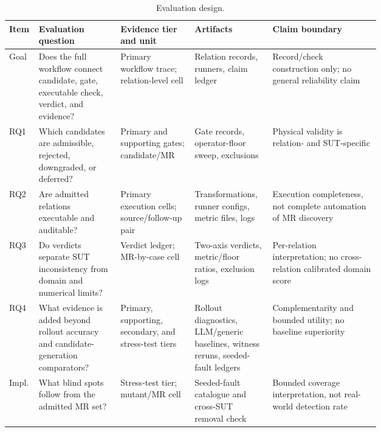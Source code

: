 \documentclass[preprint,12pt]{elsarticle}
\begin{document}
\begin{table}[!htbp]
\centering
\caption{Evaluation design.}
\label{tab:rqmap}
\scriptsize
\setlength{\tabcolsep}{1.5pt}
\begin{tabularx}{\linewidth}{@{}>{\raggedright\arraybackslash}p{0.08\linewidth}>{\raggedright\arraybackslash}p{0.22\linewidth}>{\raggedright\arraybackslash}p{0.20\linewidth}>{\raggedright\arraybackslash}p{0.21\linewidth}Y@{}}
\toprule
\textbf{Item} & \textbf{Evaluation question} & \textbf{Evidence tier and unit} & \textbf{Artifacts} & \textbf{Claim boundary} \\
\midrule
Goal & Does the full workflow connect candidate, gate, executable check, verdict, and evidence? & Primary workflow trace; relation-level cell & Relation records, runners, claim ledger & Record/check construction only; no general reliability claim \\
RQ1 & Which candidates are admissible, rejected, downgraded, or deferred? & Primary and supporting gates; candidate/MR & Gate records, operator-floor sweep, exclusions & Physical validity is relation- and SUT-specific \\
RQ2 & Are admitted relations executable and auditable? & Primary execution cells; source/follow-up pair & Transformations, runner configs, metric files, logs & Execution completeness, not complete automation of MR discovery \\
RQ3 & Do verdicts separate SUT inconsistency from domain and numerical limits? & Verdict ledger; MR-by-case cell & Two-axis verdicts, metric/floor ratios, exclusion logs & Per-relation interpretation; no cross-relation calibrated domain score \\
RQ4 & What evidence is added beyond rollout accuracy and candidate-generation comparators? & Primary, supporting, secondary, and stress-test tiers & Rollout diagnostics, LLM/generic baselines, witness reruns, seeded-fault ledgers & Complementarity and bounded utility; no baseline superiority \\
Impl. & What blind spots follow from the admitted MR set? & Stress-test tier; mutant/MR cell & Seeded-fault catalogue and cross-SUT removal check & Bounded coverage interpretation, not real-world detection rate \\
\bottomrule
\end{tabularx}
\end{table}
\end{document}
